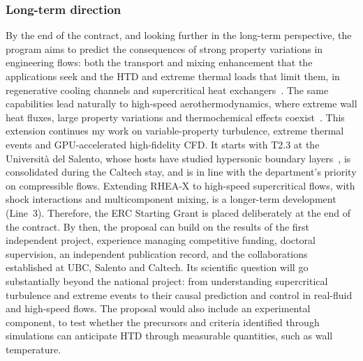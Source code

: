 \documentclass[11pt]{article}
\begin{document}
\subsubsection{Long-term direction}

By the end of the contract, and looking further in the long-term perspective, the program aims to predict the consequences of strong property variations in engineering flows: both the transport and mixing enhancement that the applications seek and the HTD and extreme thermal loads that limit them, in regenerative cooling channels and supercritical heat exchangers~\cite{Pizzarelli2018,Ahn2015}. 
The same capabilities lead naturally to high-speed aerothermodynamics, where extreme wall heat fluxes, large property variations and thermochemical effects coexist~\cite{Urzay2018,DiRenzoUrzay2021,Passiatore2022}. 
This extension continues my work on variable-property turbulence, extreme thermal events and GPU-accelerated high-fidelity CFD. 
It starts with T2.3 at the Universit\`a del Salento, whose hosts have studied hypersonic boundary layers~\cite{DiRenzoUrzay2021,Passiatore2022}, is consolidated during the Caltech stay, and is in line with the department's priority on compressible flows. 
Extending RHEA-X to high-speed supercritical flows, with shock interactions and multicomponent mixing, is a longer-term development (Line~3).
Therefore, the ERC Starting Grant is placed deliberately at the end of the contract. 
By then, the proposal can build on the results of the first independent project, experience managing competitive funding, doctoral supervision, an independent publication record, and the collaborations established at UBC, Salento and Caltech. 
Its scientific question will go substantially beyond the national project: from understanding supercritical turbulence and extreme events to their causal prediction and control in real-fluid and high-speed flows.
The proposal would also include an experimental component, to test whether the precursors and criteria identified through simulations can anticipate HTD through measurable quantities, such as wall temperature.
\end{document}

